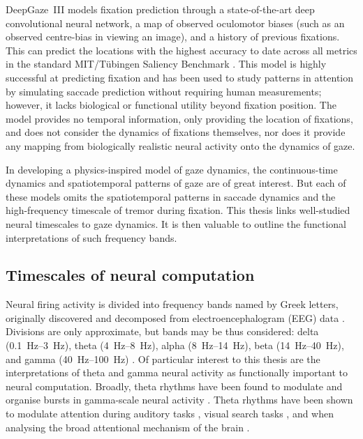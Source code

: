 DeepGaze~III \cite{kummerer_deepgaze_2022} models fixation prediction through a state-of-the-art deep convolutional neural network, a map of observed oculomotor biases (such as an observed centre-bias in viewing an image), and a history of previous fixations. This can predict the locations with the highest accuracy to date across all metrics in the standard MIT/Tübingen Saliency Benchmark \cite{mit-tuebingen-saliency-benchmark, kummerer_deepgaze_2022}. This model is highly successful at predicting fixation and has been used to study patterns in attention by simulating saccade prediction without requiring human measurements; however, it lacks biological or functional utility beyond fixation position. The model provides no temporal information, only providing the location of fixations, and does not consider the dynamics of fixations themselves, nor does it provide any mapping from biologically realistic neural activity onto the dynamics of gaze.

In developing a physics-inspired model of gaze dynamics, the continuous-time dynamics and spatiotemporal patterns of gaze are of great interest. But each of these models omits the spatiotemporal patterns in saccade dynamics and the high-frequency timescale of tremor during fixation. This thesis links well-studied neural timescales to gaze dynamics. It is then valuable to outline the functional interpretations of such frequency bands.

\subsection{Timescales of neural computation}\label{subsec:neur_freq_bands}
Neural firing activity is divided into frequency bands named by Greek letters, originally discovered and decomposed from electroencephalogram (EEG) data \cite{fan_relation_2007, klimesch_frequency_2018}. Divisions are only approximate, but bands may be thus considered: delta (\SIrange{0.1}{3}{\hertz}), theta (\SIrange{4}{8}{\hertz}), alpha (\SIrange{8}{14}{\hertz}), beta (\SIrange{14}{40}{\hertz}), and gamma (\SIrange{40}{100}{\hertz}) \cite{fan_relation_2007, klimesch_frequency_2018}. Of particular interest to this thesis are the interpretations of theta and gamma neural activity as functionally important to neural computation. Broadly, theta rhythms have been found to modulate and organise bursts in gamma-scale neural activity  \cite{qi_fractional_2022, fries_mechanism_2005, fries_rhythmic_2023, fries_rhythms_2015, spyropoulos_theta_2018, bastos_communication_2015}. Theta rhythms have been shown to modulate attention during auditory tasks \cite{wang_attention_2022, yang_neural_2024}, visual search tasks \cite{kawashima_attentional_2022, spyropoulos_theta_2018, Mo_competing_2019}, and when analysing the broad attentional mechanism of the brain \cite{tan_theta_2024, fan_relation_2007, klimesch_frequency_2018}. 

